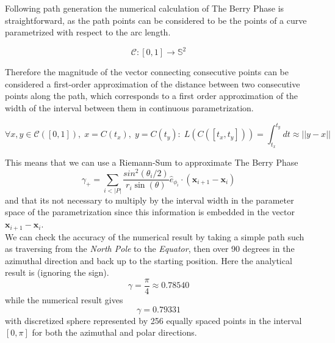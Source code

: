 \documentclass{article}
\begin{document}
Following path generation the numerical calculation of The Berry Phase is straightforward, as the path points can be considered to be the points of a curve parametrized with respect to the arc length.

\begin{equation*}
  \mathcal{C}: [0,1] \rightarrow \mathbb{S}^{2}
\end{equation*}

Therefore the magnitude of the vector connecting consecutive points can be considered a first-order approximation of the distance between two consecutive points along the path, which corresponds to a first order approximation of the width of the interval between them in continuous parametrization.

\begin{equation*}
  \forall x, y \in \mathcal{C}([0, 1]), \; x = C(t_x), \; y = C(t_y): \; L(C([t_x, t_y])) = \int_{t_{x}}^{t_{y}}dt \approx ||y - x||
\end{equation*}

This means that we can use a Riemann-Sum to approximate The Berry Phase
\begin{equation*}
  \gamma_{+} = \sum_{i < |P|} \frac{sin^{2}(\theta_{i}/2)}{r_{i}\sin(\theta)}\hat{e}_{\phi_{i}} \cdot (\bm{x}_{i + 1} - \bm{x}_{i})
\end{equation*}
and that its not necessary to multiply by the interval width in the parameter space of the parametrization since this information is embedded in the vector $\bm{x}_{i + 1} - \bm{x}_{i}$.\\

We can check the accuracy of the numerical result by taking a simple path such as traversing from the \textit{North Pole} to the \textit{Equator}, then over 90 degrees in the azimuthal direction and back up to the starting position. Here the analytical result is (ignoring the sign).
\begin{equation*}
  \gamma = \frac{\pi}{4} \approx 0.78540
\end{equation*}
while the numerical result gives
\begin{equation*}
  \gamma = 0.79331
\end{equation*}
with discretized sphere represented by 256 equally spaced points in the interval $[0, \pi]$ for both the azimuthal and polar directions.
\end{document}
